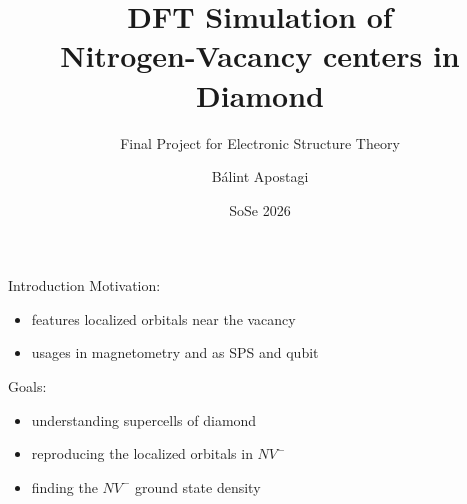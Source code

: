 \documentclass[fontsize=9pt]{beamer}
\title{DFT Simulation of\\Nitrogen-Vacancy centers in Diamond}
\subtitle{Final Project for Electronic Structure Theory}
\author{Bálint Apostagi}
\date{SoSe 2026}
\begin{document}
\frame{\titlepage}

\begin{frame}{Introduction}
    Motivation:
    \begin{itemize}
        \item features localized orbitals near the vacancy
        \item usages in magnetometry and as SPS and qubit
    \end{itemize}

    Goals:
    \begin{itemize}
        \item understanding supercells of diamond
        \item reproducing the localized orbitals in $NV^-$
        \item finding the $NV^-$ ground state density
    \end{itemize}
\end{frame}
\end{document}
